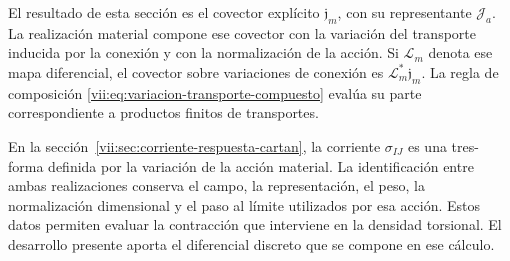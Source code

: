 El resultado de esta sección es el covector explícito
\(\mathfrak j_m\), con su representante \(\mathcal J_a\).
La realización material compone ese covector con la variación del
transporte inducida por la conexión y con la normalización de la acción.
Si \(\mathcal L_m\) denota ese mapa diferencial, el covector sobre
variaciones de conexión es \(\mathcal L_m^*\mathfrak j_m\).
La regla de composición
\eqref{vii:eq:variacion-transporte-compuesto} evalúa su parte
correspondiente a productos finitos de transportes.

En la sección~\ref{vii:sec:corriente-respuesta-cartan}, la corriente
\(\sigma_{IJ}\) es una tres-forma definida por la variación de la acción
material. La identificación entre ambas realizaciones conserva el campo,
la representación, el peso, la normalización dimensional y el paso al
límite utilizados por esa acción. Estos datos permiten evaluar la
contracción que interviene en la densidad torsional. El desarrollo
presente aporta el diferencial discreto que se compone en ese cálculo.
